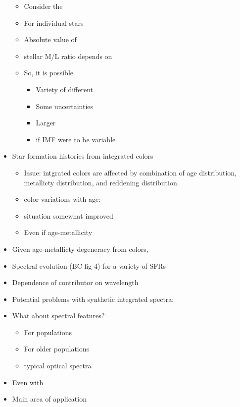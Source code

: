 \documentclass{article}
\begin{document}
\begin{itemize}
            \begin{itemize}
                \item Consider the
                \item For individual stars
                \item Absolute value of
                \item stellar M/L ratio depends on
                \item So, it is possible
                    \begin{itemize}
                        \item Variety of different
                        \item Some uncertainties
                        \item Larger
                        \item if IMF were to be variable
                    \end{itemize}
            \end{itemize}
        \item Star formation histories from integrated colors
            \begin{itemize}
                \item Issue: intgrated colors are affected by combination of age
                    distribution,
                    metallicty distribution, and reddening distribution.
                \item color variations with age:
                \item situation somewhat improved
                \item Even if age-metallicity
            \end{itemize}
        \item Given age-metallicty degeneracy from colors,
        \item Spectral evolution (BC fig 4) for a variety of SFRs
        \item Dependence of contributor on wavelength
        \item Potential problems with synthetic integrated spectra:
        \item What about spectral features?
            \begin{itemize}
                \item For populations
                \item For older populations
                \item typical optical spectra
            \end{itemize}
        \item Even with
        \item Main area of application
      \end{itemize}
\end{document}

